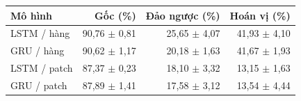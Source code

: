 \begin{tabularx}{\textwidth}{@{}Xrrr@{}}
\toprule
Mô hình & Gốc (\%) & Đảo ngược (\%) & Hoán vị (\%) \\
\midrule
LSTM / hàng & 90,76 $\pm$ 0,81 & 25,65 $\pm$ 4,07 & 41,93 $\pm$ 4,10 \\
GRU / hàng & 90,62 $\pm$ 1,17 & 20,18 $\pm$ 1,63 & 41,67 $\pm$ 1,93 \\
LSTM / patch & 87,37 $\pm$ 0,23 & 18,10 $\pm$ 3,32 & 13,15 $\pm$ 1,63 \\
GRU / patch & 87,89 $\pm$ 1,41 & 17,58 $\pm$ 3,12 & 13,54 $\pm$ 4,44 \\
\bottomrule
\end{tabularx}
